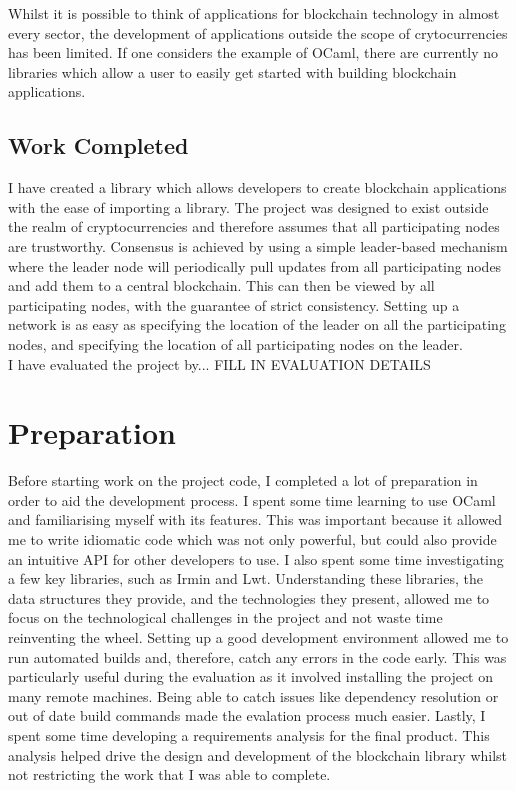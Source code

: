 \documentclass[12pt,a4paper,twoside,openright]{report}
\begin{document}
	Whilst it is possible to think of applications for blockchain technology in almost every sector, the development of applications outside the scope of crytocurrencies has been limited. 
	If one considers the example of OCaml, there are currently no libraries which allow a user to easily get started with building blockchain applications. \\

	\section{Work Completed}
	I have created a library which allows developers to create blockchain applications with the ease of importing a library.
	The project was designed to exist outside the realm of cryptocurrencies and therefore assumes that all participating nodes are trustworthy.
	Consensus is achieved by using a simple leader-based mechanism where the leader node will periodically pull updates from all participating nodes and add them to a central blockchain.
	This can then be viewed by all participating nodes, with the guarantee of strict consistency.
	Setting up a network is as easy as specifying the location of the leader on all the participating nodes, and specifying the location of all participating nodes on the leader.\\
	
	I have evaluated the project by... FILL IN EVALUATION DETAILS

	\chapter{Preparation}
	Before starting work on the project code, I completed a lot of preparation in order to aid the development process.
	I spent some time learning to use OCaml and familiarising myself with its features.
	This was important because it allowed me to write idiomatic code which was not only powerful, but could also provide an intuitive API for other developers to use.
	I also spent some time investigating a few key libraries, such as Irmin and Lwt.
	Understanding these libraries, the data structures they provide, and the technologies they present, allowed me to focus on the technological challenges in the project and not waste time reinventing the wheel. 
	Setting up a good development environment allowed me to run automated builds and, therefore, catch any errors in the code early.
	This was particularly useful during the evaluation as it involved installing the project on many remote machines.
	Being able to catch issues like dependency resolution or out of date build commands made the evalation process much easier.
	Lastly, I spent some time developing a requirements analysis for the final product. 
	This analysis helped drive the design and development of the blockchain library whilst not restricting the work that I was able to complete.
\end{document}
